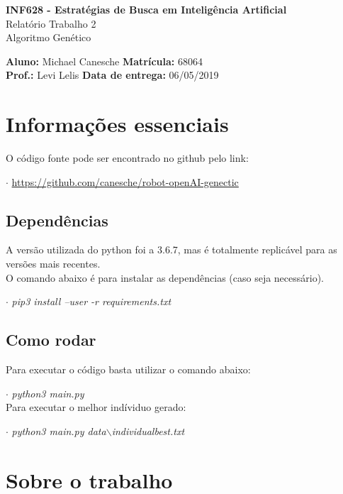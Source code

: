 \documentclass[article, a4paper, 12pt]{article}
\begin{document}
	\onehalfspacing	
	\begin{center}
		\large{\textbf{INF628 - Estratégias de Busca em Inteligência Artificial}} \\
		\Large{Relatório Trabalho 2 \\ Algoritmo Genético}
	\end{center}
	\begin{large}
		\textbf{Aluno:} Michael Canesche \hspace{2cm} \textbf{Matrícula:} 68064 \\ \textbf{Prof.:} Levi Lelis \hspace{4cm} \textbf{Data de entrega:} 06/05/2019
	\end{large}




\section{Informações essenciais}

O código fonte pode ser encontrado no github pelo link: 

$\cdot$ \url{https://github.com/canesche/robot-openAI-genectic}

\subsection{Dependências}

A versão utilizada do python foi a 3.6.7, mas é totalmente replicável para as versões mais recentes.\\
O comando abaixo é para instalar as dependências (caso seja necessário).

$\cdot$ \textit{pip3 install --user -r requirements.txt}

\subsection{Como rodar}

Para executar o código basta utilizar o comando abaixo:

$\cdot$ \textit{python3 main.py}\\
Para executar o melhor indíviduo gerado:

$\cdot$ \textit{python3 main.py data$\backslash$individualbest.txt}

\section{Sobre o trabalho}
\end{document}
